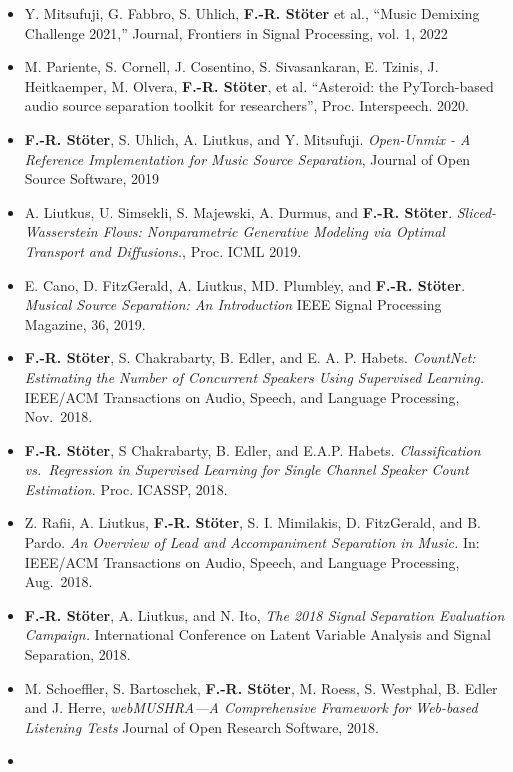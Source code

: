 \documentclass[a4paper,11pt]{article}
\providecommand{\tightlist}{%
  \setlength{\itemsep}{0pt}\setlength{\parskip}{0pt}}
\begin{document}
\begin{itemize}
\tightlist
\item
  Y. Mitsufuji, G. Fabbro, S. Uhlich, \textbf{F.-R. Stöter} et al., “Music Demixing Challenge 2021,” Journal, Frontiers in Signal Processing, vol. 1, 2022
\item 
  M. Pariente, S. Cornell, J. Cosentino, S. Sivasankaran, E. Tzinis, J. Heitkaemper, M. Olvera, \textbf{F.-R. Stöter}, et al. “Asteroid: the PyTorch-based audio source separation toolkit for researchers”,  Proc. Interspeech. 2020.
\item
  \textbf{F.-R. Stöter}, S. Uhlich, A. Liutkus, and Y. Mitsufuji.
  \emph{Open-Unmix - A Reference Implementation for Music Source Separation}, Journal of Open Source Software, 2019
\item
  A. Liutkus, U. Simsekli, S. Majewski, A. Durmus, and \textbf{F.-R. Stöter}.
  \emph{Sliced-Wasserstein Flows: Nonparametric Generative Modeling via
  Optimal Transport and Diffusions.}, Proc. ICML 2019.
\item
  E. Cano, D. FitzGerald, A. Liutkus, MD. Plumbley, and \textbf{F.-R. Stöter}.
  \emph{Musical Source Separation: An Introduction} IEEE Signal
  Processing Magazine, 36, 2019.
\item
  \textbf{F.-R. Stöter}, S. Chakrabarty, B. Edler, and E. A. P. Habets.
  \emph{CountNet: Estimating the Number of Concurrent Speakers Using
  Supervised Learning.} IEEE/ACM Transactions on Audio, Speech, and
  Language Processing, Nov.~2018.
\item
  \textbf{F.-R. Stöter}, S Chakrabarty, B. Edler, and E.A.P. Habets.
  \emph{Classification vs.~Regression in Supervised Learning for Single
  Channel Speaker Count Estimation.} Proc. ICASSP, 2018.
\item
  Z. Rafii, A. Liutkus, \textbf{F.-R. Stöter}, S. I. Mimilakis, D.
  FitzGerald, and B. Pardo. \emph{An Overview of Lead and Accompaniment
  Separation in Music.} In: IEEE/ACM Transactions on Audio, Speech, and
  Language Processing, Aug.~2018.
\item
  \textbf{F.-R. Stöter}, A. Liutkus, and N. Ito, \emph{The 2018 Signal
  Separation Evaluation Campaign.} International Conference on Latent
  Variable Analysis and Signal Separation, 2018.
\item
  M. Schoeffler, S. Bartoschek, \textbf{F.-R. Stöter}, M. Roess, S.
  Westphal, B. Edler and J. Herre, \emph{webMUSHRA---A Comprehensive
  Framework for Web-based Listening Tests} Journal of Open Research
  Software, 2018.
\item

\end{itemize}
\end{document}
